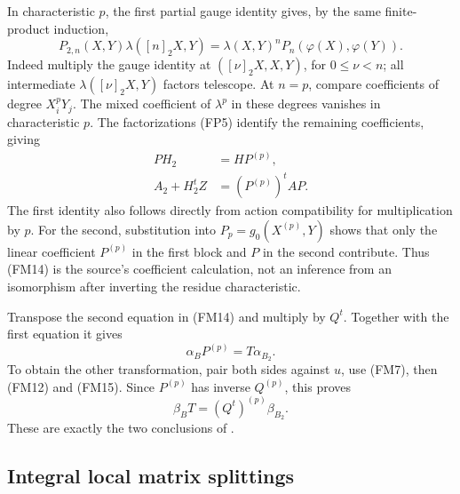 In characteristic \(p\), the first partial gauge identity
gives, by the same finite-product induction,
\[
 P_{2,n}(X,Y)\lambda([n]_2X,Y)
           =\lambda(X,Y)^nP_n(\varphi(X),\varphi(Y)).
 \tag{FM13}\label{eq:faithful-iso-Pn}
\]
Indeed multiply the gauge identity at
\(([\nu]_2X,X,Y)\), for \(0\le\nu<n\);
all intermediate \(\lambda([\nu]_2X,Y)\) factors telescope.
At \(n=p\), compare coefficients of degree
\(X_i^pY_j\).
The mixed coefficient of \(\lambda^p\) in these degrees
vanishes in characteristic \(p\).
The factorizations (FP5) identify the remaining
coefficients, giving
\[
 \begin{split}
                      PH_2&=HP^{(p)},\\
                   A_2+H_2^tZ&=(P^{(p)})^tAP .
 \end{split}
 \tag{FM14}\label{eq:faithful-H-A-transport}
\]
The first identity also follows directly from action
compatibility for multiplication by \(p\).
For the second, substitution into \(P_p=g_0(X^{(p)},Y)\)
shows that only the linear coefficient \(P^{(p)}\)
in the first block and \(P\) in the second contribute.
Thus (FM14) is the source's coefficient calculation,
not an inference from an isomorphism after inverting
the residue characteristic.

Transpose the second equation in (FM14) and multiply
by \(Q^t\).  Together with the first equation it gives
\[
                            \alpha_B P^{(p)}=T\alpha_{B_2}.
 \tag{FM15}\label{eq:faithful-alpha-coordinate}
\]
To obtain the other transformation, pair both sides
against \(u\), use (FM7), then (FM12) and (FM15).
Since \(P^{(p)}\) has inverse \(Q^{(p)}\), this proves
\[
                            \beta_BT=(Q^t)^{(p)}\beta_{B_2}.
 \tag{FM16}\label{eq:faithful-beta-coordinate}
\]
These are exactly the two conclusions of
.

\subsection{Integral local matrix splittings}
\label{subsec:faithful-local-matrix-splittings}


